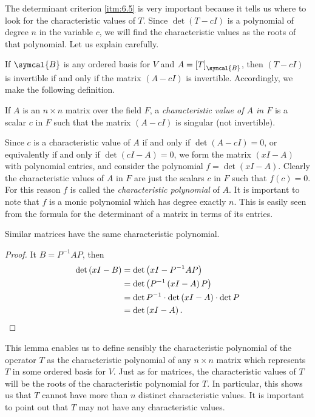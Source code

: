 The determinant criterion \ref{itm:6.5} is very important because it tells us where to look for the characteristic values of \(T\). Since \(\det\left(T-cI\right)\) is a polynomial of degree \(n\) in the variable \(c\), we will find the characteristic values as the roots of that polynomial. Let us explain carefully.

If \(\symcal{B}\) is any ordered basis for \(V\) and \(A=\left[T\right]_{\symcal{B}}\), then \(\left(T-cI\right)\) is invertible if and only if the matrix \(\left(A-cI\right)\) is invertible. Accordingly, we make the following definition.

\begin{definition}
    If \(A\) is an \(n\times n\) matrix over the field \(F\), a \emph{characteristic value of \(A\) in \(F\)} is a scalar \(c\) in \(F\) such that the matrix \(\left(A-cI\right)\) is singular (not invertible).
\end{definition}

Since \(c\) is a characteristic value of \(A\) if and only if \(\det\left(A-cI\right)=0\), or equivalently if and only if \(\det\left(cI-A\right)=0\), we form the matrix \(\left(xI-A\right)\) with polynomial entries, and consider the polynomial \(f=\det\left(xI-A\right)\). Clearly the characteristic values of \(A\) in \(F\) are just the scalars \(c\) in \(F\) such that \(f\left(c\right)=0\). For this reason \(f\) is called the \emph{characteristic polynomial} of \(A\). It is important to note that \(f\) is a monic polynomial which has degree exactly \(n\). This is easily seen from the formula for the determinant of a matrix in terms of its entries.

\begin{lemma}
    Similar matrices have the same characteristic polynomial.
\end{lemma}

\begin{proof}
    It \(B=P^{-1}AP\), then
    \begin{align*}
        \det\left(xI-B\right)&=\det\left(xI-P^{-1}AP\right)\\
        &=\det\left(P^{-1}\left(xI-A\right)P\right)\\
        &=\det P^{-1}\cdot\det\left(xI-A\right)\cdot\det P\\
        &=\det\left(xI-A\right).\qedhere
    \end{align*}
\end{proof}

This lemma enables us to define sensibly the characteristic polynomial of the operator \(T\) as the characteristic polynomial of any \(n\times n\) matrix which represents \(T\) in some ordered basis for \(V\). Just as for matrices, the characteristic values of \(T\) will be the roots of the characteristic polynomial for \(T\). In particular, this shows us that \(T\) cannot have more than \(n\) distinct characteristic values. It is important to point out that \(T\) may not have any characteristic values.

